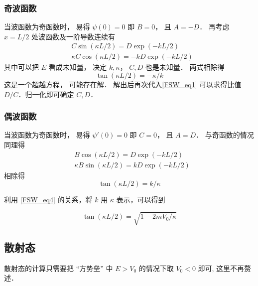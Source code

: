 \subsubsection{奇波函数}
当波函数为奇函数时， 易得 $\psi(0) = 0$ 即 $B = 0$， 且 $A = -D$． 再考虑 $x = L/2$ 处波函数及一阶导数连续有
\begin{equation}\label{FSW_eq1}
\begin{aligned}
&C\sin(\kappa L/2) = D \exp(-kL/2)\\
&\kappa C \cos(\kappa L/2) = -kD \exp(-kL/2)
\end{aligned}
\end{equation}
其中可以把 $E$ 看成未知量， 决定 $k, \kappa$， $C,D$ 也是未知量． 两式相除得
\begin{equation}\label{FSW_eq2}
\tan(\kappa L/2) = -\kappa/k
\end{equation}
这是一个超越方程， 可能存在解． 解出后再次代入\autoref{FSW_eq1} 可以求得比值 $D/C$．归一化即可确定 $C, D$．

\subsubsection{偶波函数}
当波函数为奇函数时， 易得 $\psi'(0) = 0$ 即 $C = 0$， 且 $A = D$． 与奇函数的情况同理得
\begin{equation}
\begin{aligned}
&B\cos(\kappa L/2) = D \exp(-kL/2)\\
&\kappa B \sin(\kappa L/2) = kD \exp(-kL/2)
\end{aligned}
\end{equation}
相除得
\begin{equation}\label{FSW_eq3}
\tan(\kappa L/2) = k/\kappa
\end{equation}

利用 \autoref{FSW_eq4} 的关系，将 $k$ 用 $\kappa$ 表示，可以得到

\begin{equation}
\tan(\kappa L/2)=\sqrt{1-2mV_0/\kappa}
\end{equation}


\subsection{散射态}

散射态的计算只需要把 “方势垒” 中 $E > V_0$ 的情况下取 $V_0 < 0$ 即可, 这里不再赘述．
